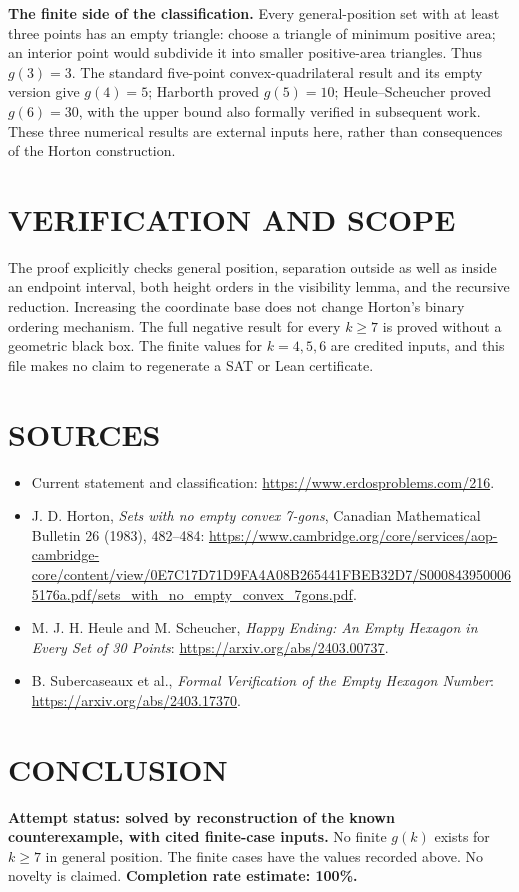 \textbf{The finite side of the classification.} Every general-position set with at least three points has an empty triangle: choose a triangle of minimum positive area; an interior point would subdivide it into smaller positive-area triangles. Thus $g(3)=3$. The standard five-point convex-quadrilateral result and its empty version give $g(4)=5$; Harborth proved $g(5)=10$; Heule--Scheucher proved $g(6)=30$, with the upper bound also formally verified in subsequent work. These three numerical results are external inputs here, rather than consequences of the Horton construction.

\section{VERIFICATION AND SCOPE}
The proof explicitly checks general position, separation outside as well as inside an endpoint interval, both height orders in the visibility lemma, and the recursive reduction. Increasing the coordinate base does not change Horton's binary ordering mechanism. The full negative result for every $k\geq7$ is proved without a geometric black box. The finite values for $k=4,5,6$ are credited inputs, and this file makes no claim to regenerate a SAT or Lean certificate.

\section{SOURCES}
\begin{itemize}
\item Current statement and classification: \url{https://www.erdosproblems.com/216}.
\item J. D. Horton, \emph{Sets with no empty convex 7-gons}, Canadian Mathematical Bulletin 26 (1983), 482--484: \url{https://www.cambridge.org/core/services/aop-cambridge-core/content/view/0E7C17D71D9FA4A08B265441FBEB32D7/S0008439500065176a.pdf/sets_with_no_empty_convex_7gons.pdf}.
\item M. J. H. Heule and M. Scheucher, \emph{Happy Ending: An Empty Hexagon in Every Set of 30 Points}: \url{https://arxiv.org/abs/2403.00737}.
\item B. Subercaseaux et al., \emph{Formal Verification of the Empty Hexagon Number}: \url{https://arxiv.org/abs/2403.17370}.
\end{itemize}
\section{CONCLUSION}
\textbf{Attempt status: solved by reconstruction of the known counterexample, with cited finite-case inputs.} No finite $g(k)$ exists for $k\geq7$ in general position. The finite cases have the values recorded above. No novelty is claimed.
\textbf{Completion rate estimate: 100\%.}
